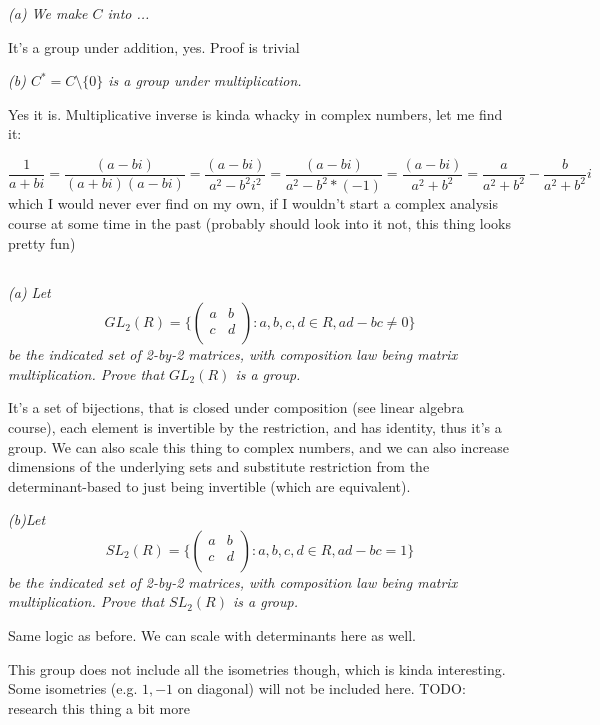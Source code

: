 \documentclass[11pt,oneside,titlepage]{book}
\newcommand{\set}[1]{\{ #1 \}}
\begin{document}
\textit{(a) We make $C$ into ...}

It's a group under addition, yes. Proof is trivial

\textit{(b) $C^* = C \setminus \set{0}$ is a group under multiplication.}

Yes it is. Multiplicative inverse is kinda whacky in complex numbers, let me find it:

$$\frac{1}{a + bi} = \frac{(a - bi)}{(a + bi)(a - bi)} =
\frac{(a - bi)}{a^2 - b^2i^2} = \frac{(a - bi)}{a^2 - b^2 * (-1)}  =
\frac{(a - bi)}{a^2 + b^2}  = \frac{a}{a^2 + b^2}  - \frac{b}{a^2 + b^2}i$$
which I would never ever find on my own, if I wouldn't start a complex
analysis course at some time in the past (probably should look into 
it not, this thing looks pretty fun)

\subsection{}

\textit{(a) Let
$$GL_2(R) = \set{
  \begin{pmatrix}
    a & b \\
    c & d \\
  \end{pmatrix}: a, b, c, d \in R, ad - bc \neq 0}
  $$
  be the indicated set of 2-by-2 matrices, with composition law being matrix multiplication.
  Prove that $GL_2(R)$ is a group.
}

It's a set of bijections, that is closed under composition (see linear
algebra course), each element is invertible by the restriction, and
has identity, thus it's a group.  We can also scale this thing to
complex numbers, and we can also increase dimensions of the underlying
sets and substitute restriction from the determinant-based to just
being invertible (which are equivalent).

\textit{(b)Let
$$SL_2(R) = \set{
  \begin{pmatrix}
    a & b \\
    c & d \\
  \end{pmatrix}: a, b, c, d \in R, ad - bc = 1}
  $$
  be the indicated set of 2-by-2 matrices, with composition law being matrix multiplication.
  Prove that $SL_2(R)$ is a group.
}

Same logic as before. We can scale with determinants here as well.

This group does not include all the isometries though, which is kinda
interesting.  Some isometries (e.g. $1, -1$ on diagonal) will not be
included here. TODO: research this thing a bit more
\end{document}
